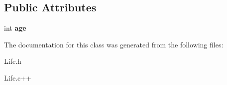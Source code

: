 \subsection*{Public Attributes}
\begin{DoxyCompactItemize}
\item 
\hypertarget{classFredkinCell_a755dea54626a9742e4dad6a03755706b}{int {\bfseries age}}\label{classFredkinCell_a755dea54626a9742e4dad6a03755706b}

\end{DoxyCompactItemize}


The documentation for this class was generated from the following files\-:\begin{DoxyCompactItemize}
\item 
Life.\-h\item 
Life.\-c++\end{DoxyCompactItemize}
